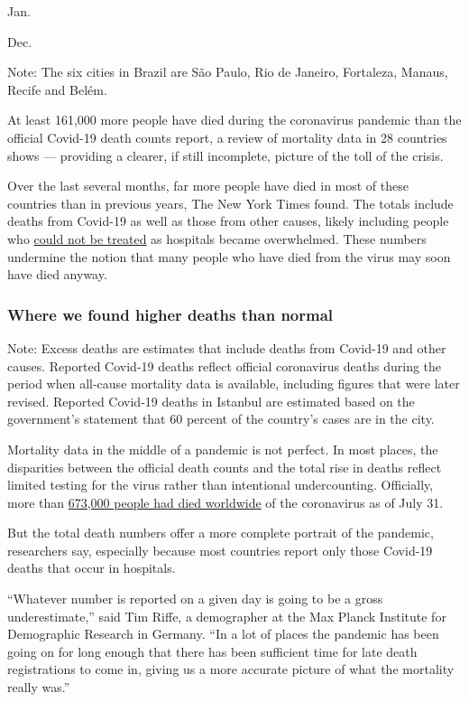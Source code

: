 Jan.

Dec.

Note: The six cities in Brazil are São Paulo, Rio de Janeiro, Fortaleza,
Manaus, Recife and Belém.

At least 161,000 more people have died during the coronavirus pandemic
than the official Covid-19 death counts report, a review of mortality
data in 28 countries shows --- providing a clearer, if still incomplete,
picture of the toll of the crisis.

Over the last several months, far more people have died in most of these
countries than in previous years, The New York Times found. The totals
include deaths from Covid-19 as well as those from other causes, likely
including people who
\href{https://www.nytimes.com/2020/04/20/health/treatment-delays-coronavirus.html}{could
not be treated} as hospitals became overwhelmed. These numbers undermine
the notion that many people who have died from the virus may soon have
died anyway.

\hypertarget{where-we-found-higher-deaths-than-normal}{%
\subsubsection{Where we found higher deaths than
normal}\label{where-we-found-higher-deaths-than-normal}}

Note: Excess deaths are estimates that include deaths from Covid-19 and
other causes. Reported Covid-19 deaths reflect official coronavirus
deaths during the period when all-cause mortality data is available,
including figures that were later revised. Reported Covid-19 deaths in
Istanbul are estimated based on the government's statement that 60
percent of the country's cases are in the city.

Mortality data in the middle of a pandemic is not perfect. In most
places, the disparities between the official death counts and the total
rise in deaths reflect limited testing for the virus rather than
intentional undercounting. Officially, more than
\href{https://www.nytimes.com/interactive/2020/world/coronavirus-maps.html}{673,000
people had died worldwide} of the coronavirus as of July 31.

But the total death numbers offer a more complete portrait of the
pandemic, researchers say, especially because most countries report only
those Covid-19 deaths that occur in hospitals.

``Whatever number is reported on a given day is going to be a gross
underestimate,'' said Tim Riffe, a demographer at the Max Planck
Institute for Demographic Research in Germany. ``In a lot of places the
pandemic has been going on for long enough that there has been
sufficient time for late death registrations to come in, giving us a
more accurate picture of what the mortality really was.''


